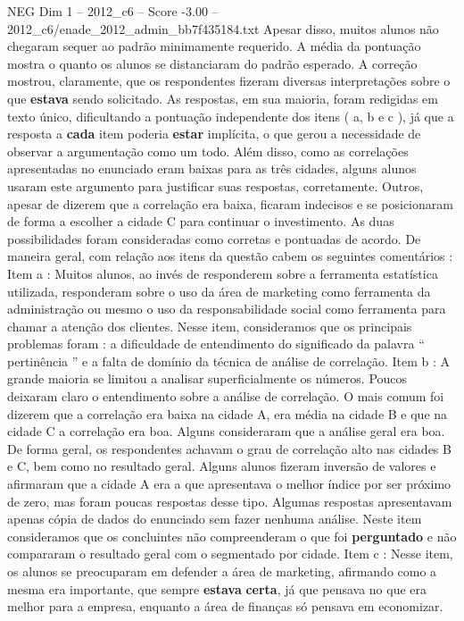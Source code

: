 \begin{textsample}{NEG Dim 1 – 2012\_c6 – Score -3.00 – 2012\_c6/enade\_2012\_admin\_bb7f435184.txt}
Apesar disso, muitos alunos não chegaram sequer ao padrão minimamente requerido.
A média da pontuação mostra o quanto os alunos se distanciaram do padrão esperado.
A correção mostrou, claramente, que os respondentes fizeram diversas interpretações sobre o que \textbf{estava} sendo solicitado.
As respostas, em sua maioria, foram redigidas em texto único, dificultando a pontuação independente dos itens ( a, b e c ), já que a resposta a \textbf{cada} item poderia \textbf{estar} implícita, o que gerou a necessidade de observar a argumentação como um todo.
Além disso, como as correlações apresentadas no enunciado eram baixas para as três cidades, alguns alunos usaram este argumento para justificar suas respostas, corretamente.
Outros, apesar de dizerem que a correlação era baixa, ficaram indecisos e se posicionaram de forma a escolher a cidade C para continuar o investimento.
As duas possibilidades foram consideradas como corretas e pontuadas de acordo.
De maneira geral, com relação aos itens da questão cabem os seguintes comentários : Item a : Muitos alunos, ao invés de responderem sobre a ferramenta estatística utilizada, responderam sobre o uso da área de marketing como ferramenta da administração ou mesmo o uso da responsabilidade social como ferramenta para chamar a atenção dos clientes.
Nesse item, consideramos que os principais problemas foram : a dificuldade de entendimento do significado da palavra “ pertinência ” e a falta de domínio da técnica de análise de correlação.
Item b : A grande maioria se limitou a analisar superficialmente os números.
Poucos deixaram claro o entendimento sobre a análise de correlação.
O mais comum foi dizerem que a correlação era baixa na cidade A, era média na cidade B e que na cidade C a correlação era boa.
Alguns consideraram que a análise geral era boa.
De forma geral, os respondentes achavam o grau de correlação alto nas cidades B e C, bem como no resultado geral.
Alguns alunos fizeram inversão de valores e afirmaram que a cidade A era a que apresentava o melhor índice por ser próximo de zero, mas foram poucas respostas desse tipo.
Algumas respostas apresentavam apenas cópia de dados do enunciado sem fazer nenhuma análise.
Neste item consideramos que os concluintes não compreenderam o que foi \textbf{perguntado} e não compararam o resultado geral com o segmentado por cidade.
Item c : Nesse item, os alunos se preocuparam em defender a área de marketing, afirmando como a mesma era importante, que sempre \textbf{estava} \textbf{certa}, já que pensava no que era melhor para a empresa, enquanto a área de finanças só pensava em economizar.

\end{textsample}
